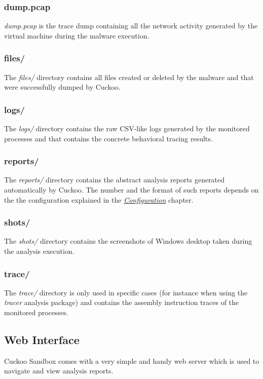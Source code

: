\documentclass[letterpaper,10pt,english]{sphinxmanual}
\begin{document}
\subsubsection{dump.pcap}
\label{usage/results:dump-pcap}
\emph{dump.pcap} is the trace dump containing all the network activity generated by
the virtual machine during the malware execution.


\subsubsection{files/}
\label{usage/results:files}
The \emph{files/} directory contains all files created or deleted by the malware and
that were successfully dumped by Cuckoo.


\subsubsection{logs/}
\label{usage/results:logs}
The \emph{logs/} directory contains the raw CSV-like logs generated by the monitored
processes and that contains the concrete behavioral tracing results.


\subsubsection{reports/}
\label{usage/results:reports}
The \emph{reports/} directory contains the abstract analysis reports generated
automatically by Cuckoo. The number and the format of such reports depends on
the the configuration explained in the {\hyperref[installation/host/configuration::doc]{\emph{Configuration}}}
chapter.


\subsubsection{shots/}
\label{usage/results:shots}
The \emph{shots/} directory contains the screenshots of Windows desktop taken during
the analysis execution.


\subsubsection{trace/}
\label{usage/results:trace}
The \emph{trace/} directory is only used in specific cases (for instance when using
the \emph{tracer} analysis package) and contains the assembly instruction traces of
the monitored processes.


\subsection{Web Interface}
\label{usage/web:web-interface}\label{usage/web::doc}
Cuckoo Sandbox comes with a very simple and handy web server which is used
to navigate and view analysis reports.
\end{document}
